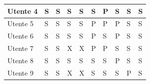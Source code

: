 \begin{table}[ht]
{\begin{tabular}{l|l|l|l|l|l|l|l|l|l|}
                \multicolumn{1}{|l|}{Utente 4} & S & S & S & S & S & P & S & S & S \\ \hline
                \multicolumn{1}{|l|}{Utente 5} & S & S & S & S & P & P & P & S & S \\ \hline
                \multicolumn{1}{|l|}{Utente 6} & S & S & S & S & P & S & P & S & S \\ \hline %
                \multicolumn{1}{|l|}{Utente 7} & S & S & X & X & P & P & S & S & S \\ \hline %
                \multicolumn{1}{|l|}{Utente 8} & S & S & S & S & S & S & P & S & S \\ \hline %
                \multicolumn{1}{|l|}{Utente 9} & S & S & X & X & S & S & S & P & S \\ \hline %
                \end{tabular}
                }
            \end{table}
    
